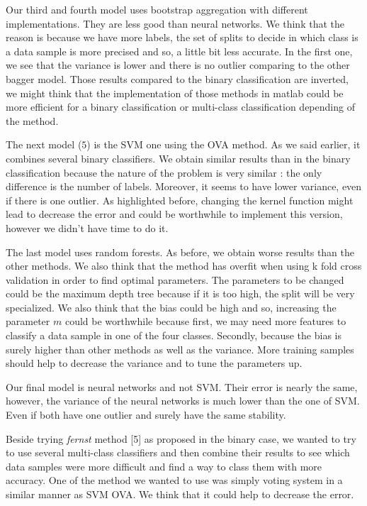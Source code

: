 \documentclass{article} %
\begin{document}
Our third and fourth model uses bootstrap aggregation with different implementations. They are less good than neural networks. We think that the reason is because we have more labels, the set of splits to decide in which class is a data sample is more precised and so, a little bit less accurate. In the first one, we see that the variance is lower and there is no outlier comparing to the other bagger model. Those results compared to the binary classification are inverted, we might think that the implementation of those methods in matlab could be more efficient for a binary classification or multi-class classification depending of the method.

The next model ($5$) is the SVM one using the OVA method. As we said earlier, it combines several binary classifiers. We obtain similar results than in the binary classification because the nature of the problem is very similar : the only difference is the number of labels. Moreover, it seems to have lower variance, even if there is one outlier. As highlighted before, changing the kernel function might lead to decrease the error and could be worthwhile to implement this version, however we didn't have time to do it.

The last model uses random forests. As before, we obtain worse results than the other methods. We also think that the method has overfit when using k fold cross validation in order to find optimal parameters. The parameters to be changed could be the maximum depth tree because if it is too high, the split will be very specialized. We also think that the bias could be high and so, increasing the parameter $m$ could be worthwhile because first, we may need more features to classify a data sample in one of the four classes. Secondly, because the bias is surely higher than other methods as well as the variance. More training samples should help to decrease the variance and to tune the parameters up.

Our final model is neural networks and not SVM. Their error is nearly the same, however, the variance of the neural networks is much lower than the one of SVM. Even if both have one outlier and surely have the same stability.

Beside trying \textit{fernst} method [5] as proposed in the binary case, we wanted to try to use several multi-class classifiers and then combine their results to see which data samples were more difficult and find a way to class them with more accuracy. One of the method we wanted to use was simply voting system in a similar manner as SVM OVA. We think that it could help to decrease the error.
\end{document}
